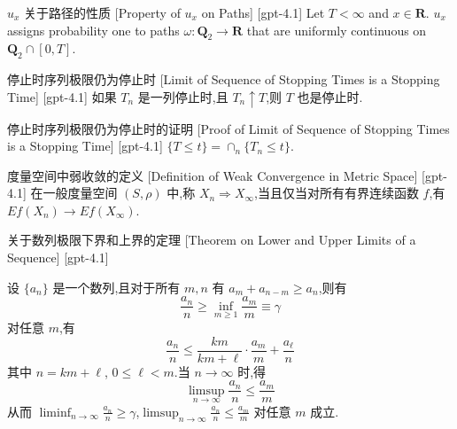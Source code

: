 \documentclass[UTF8]{ctexart}
\begin{document}
    
    
    \begin{ppt}
        {$
    u_x$ 关于路径的性质}
        [Property of $
    u_x$ on Paths]
        [gpt-4.1]
        Let $T < \infty$ and $x \in \mathbf{R}$.
$
u_x$ assigns probability one to paths $\omega : \mathbf{Q}_2 \to \mathbf{R}$ that are uniformly continuous on $\mathbf{Q}_2 \cap [0, T]$.
    \end{ppt}
    
    
    
    \begin{thm}
        {停止时序列极限仍为停止时}
        [Limit of Sequence of Stopping Times is a Stopping Time]
        [gpt-4.1]
        如果 $T_{n}$ 是一列停止时,且 $T_{n} \uparrow T$,则 $T$ 也是停止时.
    \end{thm}
    
    
    
    \begin{prf}
        {停止时序列极限仍为停止时的证明}
        [Proof of Limit of Sequence of Stopping Times is a Stopping Time]
        [gpt-4.1]
        $\{ T \leq t \} = \cap_{n} \{ T_{n} \leq t \}$.
    \end{prf}
    
    
    
    \begin{dfn}
        {度量空间中弱收敛的定义}
        [Definition of Weak Convergence in Metric Space]
        [gpt-4.1]
        在一般度量空间 $(S, \rho)$ 中,称 $X_{n} \Rightarrow X_{\infty}$,当且仅当对所有有界连续函数 $f$,有 $E f (X_{n}) \to E f (X_{\infty})$.
    \end{dfn}
    
    
    
    \begin{thm}
        {关于数列极限下界和上界的定理}
        [Theorem on Lower and Upper Limits of a Sequence]
        [gpt-4.1]
        
设 $\{a_n\}$ 是一个数列,且对于所有 $m, n$ 有 $a_{m} + a_{n-m} \geq a_{n}$,则有
\[
\frac{a_n}{n} \geq \inf_{m \geq 1} \frac{a_m}{m} \equiv \gamma
\]
对任意 $m$,有
\[
\frac{a_{n}}{n} \leq \frac{k m}{k m + \ell} \cdot \frac{a_{m}}{m} + \frac{a_{\ell}}{n}
\]
其中 $n = k m + \ell$, $0 \leq \ell < m$.当 $n \to \infty$ 时,得
\[
\limsup_{n \to \infty} \frac{a_n}{n} \leq \frac{a_m}{m}
\]
从而 $\liminf_{n \to \infty} \frac{a_n}{n} \geq \gamma$,$\limsup_{n \to \infty} \frac{a_n}{n} \leq \frac{a_m}{m}$ 对任意 $m$ 成立.

    \end{thm}
    
\end{document}
